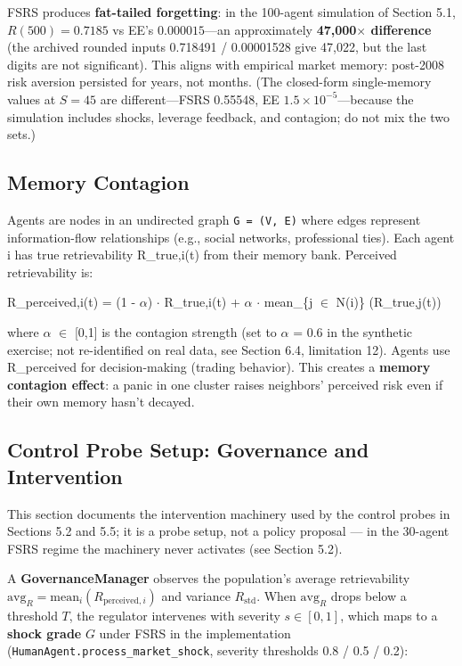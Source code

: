 \documentclass[11pt]{article}
\begin{document}
FSRS produces \textbf{fat-tailed forgetting}: in the 100-agent simulation of Section 5.1, $R(500) = 0.7185$ vs EE's $0.000015$---an approximately \textbf{47,000$\times$ difference} (the archived rounded inputs 0.718491 / 0.00001528 give 47,022, but the last digits are not significant). This aligns with empirical market memory: post-2008 risk aversion persisted for years, not months. (The closed-form single-memory values at $S=45$ are different---FSRS 0.55548, EE $1.5 \times 10^{-5}$---because the simulation includes shocks, leverage feedback, and contagion; do not mix the two sets.)

\subsection{Memory Contagion}
Agents are nodes in an undirected graph \texttt{G = (V, E)} where edges represent information-flow relationships (e.g., social networks, professional ties). Each agent i has true retrievability R\_true,i(t) from their memory bank. Perceived retrievability is:

R\_perceived,i(t) = (1 - $\alpha$) $\cdot$ R\_true,i(t) + $\alpha$ $\cdot$ mean\_\{j $\in$ N(i)\} (R\_true,j(t))

where $\alpha$ $\in$ [0,1] is the contagion strength (set to $\alpha$ = 0.6 in the synthetic exercise; not re-identified on real data, see Section 6.4, limitation 12). Agents use R\_perceived for decision-making (trading behavior). This creates a \textbf{memory contagion effect}: a panic in one cluster raises neighbors' perceived risk even if their own memory hasn't decayed.

\subsection{Control Probe Setup: Governance and Intervention}
This section documents the intervention machinery used by the control probes in Sections 5.2 and 5.5; it is a probe setup, not a policy proposal --- in the 30-agent FSRS regime the machinery never activates (see Section 5.2).

A \textbf{GovernanceManager} observes the population's average retrievability $\text{avg}_R = \text{mean}_i(R_{\text{perceived},i})$ and variance $R_{\text{std}}$. When $\text{avg}_R$ drops below a threshold $T$, the regulator intervenes with severity $s \in [0,1]$, which maps to a \textbf{shock grade} $G$ under FSRS in the implementation (\texttt{HumanAgent.process\_market\_shock}, severity thresholds 0.8 / 0.5 / 0.2):
\end{document}
